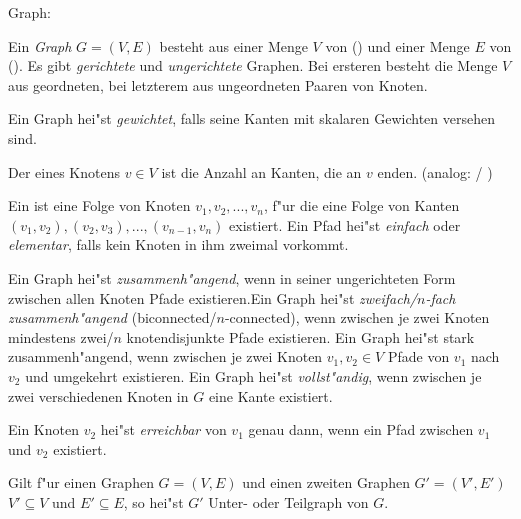  Graph:{
  Ein {\itshape Graph} $G=(V,E)$ besteht aus einer Menge $V$ von 
   () und einer Menge $E$ von 
   (). Es gibt 
  {\itshape gerichtete} und {\itshape ungerichtete} Graphen. Bei ersteren
  besteht die Menge $V$ aus geordneten, bei letzterem aus ungeordneten Paaren
  von Knoten.
  
  Ein Graph hei"st \textit{gewichtet}, falls seine Kanten mit skalaren 
  Gewichten versehen sind.
  
  Der {\itshape {}} eines Knotens $v\in V$ ist die Anzahl an 
  Kanten, die an $v$ enden. (analog: /
  )
  
  Ein {\itshape {}} ist eine Folge von Knoten $v_1,v_2,...,v_n$, 
  f"ur die eine Folge von Kanten $(v_1,v_2),(v_2,v_3),...,(v_{n-1},v_n)$ 
  existiert. Ein Pfad hei"st \textit{einfach}  oder \textit{elementar}, falls 
  kein Knoten in ihm zweimal vorkommt.
  
  Ein Graph hei"st \textit{zusammenh"angend}, wenn in seiner ungerichteten Form
  zwischen allen Knoten Pfade existieren.Ein Graph hei"st 
  \textit{zweifach/$n$-fach zusammenh"angend} (biconnected/$n$-connected), wenn zwischen 
  je zwei Knoten mindestens zwei/$n$ knotendisjunkte Pfade existieren.
  Ein Graph hei"st stark zusammenh"angend, wenn zwischen je zwei Knoten 
  $v_1,v_2\in V$ Pfade von $v_1$ nach $v_2$ und umgekehrt existieren.
  Ein Graph hei"st \textit{vollst"andig}, wenn zwischen je zwei verschiedenen
  Knoten in $G$ eine Kante existiert.

  Ein Knoten $v_2$ hei"st {\itshape erreichbar} von $v_1$ genau dann, wenn 
  ein Pfad zwischen $v_1$ und $v_2$ existiert.
  
  Gilt f"ur einen Graphen $G=(V,E)$ und einen zweiten Graphen $G'=(V',E')$
  $V'\subseteq V$ und $E'\subseteq E$, so hei"st $G'$ Unter- oder Teilgraph
  von $G$.
  
}
